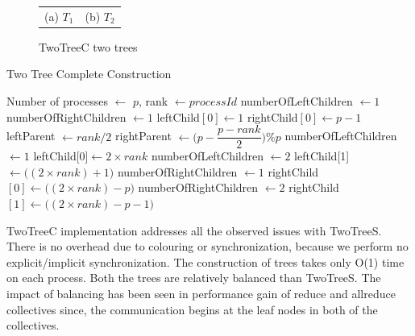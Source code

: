 \documentclass[sigplan,review,anonymous]{acmart}\settopmatter{printfolios=true,printccs=false,printacmref=false}
\begin{document}
\begin{figure}[t]
\begin{tabular}{cc}
(a) $T_1$ & (b) $T_2$ \\
\end{tabular}
\caption{TwoTreeC two trees}
\label{fig:twoTreeC}
\end{figure}


\begin{algorithm}
 \scriptsize
\caption{Two Tree Complete Construction}\label{alg:TwoTreeComp}
\begin{algorithmic}[1]
\REQUIRE Number of processes $\leftarrow$ \(p\), rank $\leftarrow processId$ 
    \STATE numberOfLeftChildren $ \leftarrow 1$
    \STATE numberOfRightChildren $ \leftarrow 1$
    \STATE leftChild$[0] \leftarrow 1$
    \STATE rightChild$[0] \leftarrow p-1$
    \STATE leftParent $ \leftarrow rank / 2$
    \STATE rightParent $ \leftarrow \big(p-\dfrac{p-rank}{2}\big)\%p$
         \STATE numberOfLeftChildren $ \leftarrow 1$
         \STATE leftChild[0]$ \leftarrow 2 \times rank$
    \ENDIF
         \STATE numberOfLeftChildren $ \leftarrow 2$
         \STATE leftChild[1]$ \leftarrow \big((2 \times rank) + 1\big)$
    \ENDIF
         \STATE numberOfRightChildren $ \leftarrow 1$
         \STATE rightChild$[0] \leftarrow \big((2 \times rank) - p\big)$
    \ENDIF
         \STATE numberOfRightChildren $ \leftarrow 2$
         \STATE rightChild$[1] \leftarrow \big((2 \times rank) - p - 1\big)$
    \ENDIF
\ENDIF
\end{algorithmic}
\end{algorithm}

TwoTreeC implementation addresses all the observed issues with TwoTreeS. There is no overhead due to colouring or synchronization, because we perform no explicit/implicit synchronization. The construction of trees takes only O(1) time on each process.
Both the trees are relatively balanced than TwoTreeS. The impact of balancing has been seen in performance gain of reduce and allreduce collectives since, the communication begins at the leaf nodes in both of the collectives.
\end{document}
